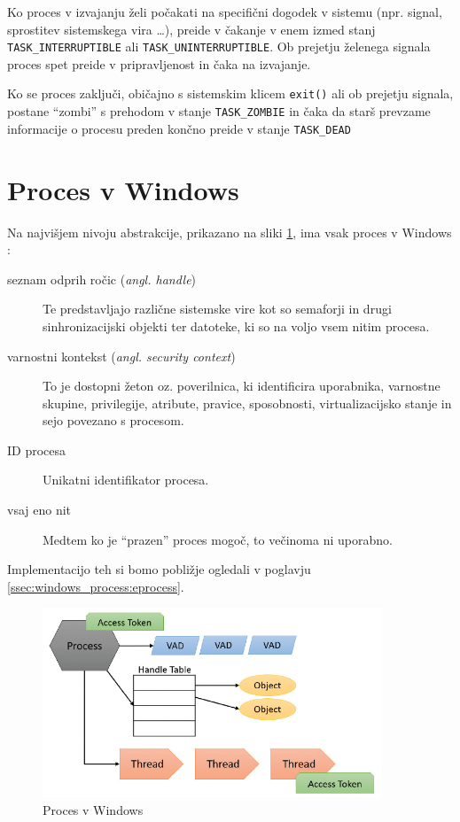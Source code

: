 \documentclass[a4paper,12pt,openright]{book}
\begin{document}
Ko proces v izvajanju želi počakati na specifični dogodek v sistemu (npr. signal, sprostitev sistemskega vira \dots), preide v čakanje v enem izmed stanj \texttt{TASK\_INTERRUPTIBLE} ali \texttt{TASK\_UNINTERRUPTIBLE}.
Ob prejetju želenega signala proces spet preide v pripravljenost in čaka na izvajanje.

Ko se proces zaključi, običajno s sistemskim klicem \texttt{exit()} ali ob prejetju signala, postane ``zombi'' s prehodom v stanje \texttt{TASK\_ZOMBIE} in čaka da starš prevzame informacije o procesu preden končno preide v stanje \texttt{TASK\_DEAD}

\section{Proces v Windows}

Na najvišjem nivoju abstrakcije, prikazano na sliki \ref{fig:windows_process}, ima vsak proces v Windows \cite{Yosifovich_Russinovich_Solomon_Ionescu_2017}:
\begin{description}
	\item[seznam odprih ročic (\textit{angl. handle})] Te predstavljajo različne sistemske vire kot so semaforji in drugi sinhronizacijski objekti ter datoteke, ki so na voljo vsem nitim procesa.
	\item[varnostni kontekst (\textit{angl. security context})] To je dostopni žeton oz. poverilnica, ki identificira uporabnika, varnostne skupine, privilegije, atribute, pravice, sposobnosti, virtualizacijsko stanje in sejo povezano s procesom.
	\item[ID procesa] Unikatni identifikator procesa.
	\item[vsaj eno nit] Medtem ko je ``prazen'' proces mogoč, to večinoma ni uporabno. 
\end{description}
Implementacijo teh si bomo pobližje ogledali v poglavju \ref{ssec:windows_process:eprocess}.

\begin{figure}[h!]
	\begin{center}
		\includegraphics[width=0.9\textwidth]{images/windows_process.png}
	\end{center}
	\caption{Proces v Windows \cite{Yosifovich_Russinovich_Solomon_Ionescu_2017}}
	\label{fig:windows_process}
\end{figure}
\end{document}

